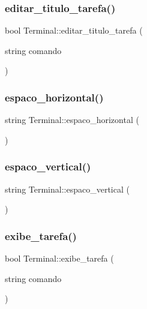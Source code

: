 \subsubsection{\texorpdfstring{editar\+\_\+titulo\+\_\+tarefa()}{editar\_titulo\_tarefa()}}
{\footnotesize\ttfamily bool Terminal\+::editar\+\_\+titulo\+\_\+tarefa (\begin{DoxyParamCaption}\item[{string}]{comando }\end{DoxyParamCaption})}

\mbox{\label{classTerminal_a74aa95517ba338132e791a2aefb77b7a}} 
\subsubsection{\texorpdfstring{espaco\+\_\+horizontal()}{espaco\_horizontal()}}
{\footnotesize\ttfamily string Terminal\+::espaco\+\_\+horizontal (\begin{DoxyParamCaption}{ }\end{DoxyParamCaption})}

\mbox{\label{classTerminal_af3b082b98755b9f60f02315e5d207538}} 
\subsubsection{\texorpdfstring{espaco\+\_\+vertical()}{espaco\_vertical()}}
{\footnotesize\ttfamily string Terminal\+::espaco\+\_\+vertical (\begin{DoxyParamCaption}{ }\end{DoxyParamCaption})}

\mbox{\label{classTerminal_af2b2089477ced07e4acf9e8acafcd2f4}} 
\subsubsection{\texorpdfstring{exibe\+\_\+tarefa()}{exibe\_tarefa()}}
{\footnotesize\ttfamily bool Terminal\+::exibe\+\_\+tarefa (\begin{DoxyParamCaption}\item[{string}]{comando }\end{DoxyParamCaption})}

